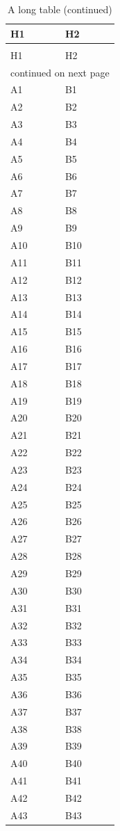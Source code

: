 \documentclass{article}
\begin{document}
\begin{longtable}{ll}
  \caption{A long table}\label{tab:a}\\
  H1 & H2 \\
  \endfirsthead
  \caption[]{A long table (continued)}\\
  H1 & H2 \\
  \endhead
  \multicolumn{2}{r}{continued on next page}\\
  \endfoot
  \endlastfoot
  A1 & B1 \\ A2 & B2 \\ A3 & B3 \\ A4 & B4 \\ A5 & B5 \\ A6 & B6 \\ A7 & B7 \\
  A8 & B8 \\ A9 & B9 \\ A10 & B10 \\ A11 & B11 \\ A12 & B12 \\ A13 & B13 \\
  A14 & B14 \\ A15 & B15 \\ A16 & B16 \\ A17 & B17 \\ A18 & B18 \\ A19 & B19 \\
  A20 & B20 \\ A21 & B21 \\ A22 & B22 \\ A23 & B23 \\ A24 & B24 \\ A25 & B25 \\
  A26 & B26 \\ A27 & B27 \\ A28 & B28 \\ A29 & B29 \\ A30 & B30 \\ A31 & B31 \\
  A32 & B32 \\ A33 & B33 \\ A34 & B34 \\ A35 & B35 \\ A36 & B36 \\ A37 & B37 \\
  A38 & B38 \\ A39 & B39 \\ A40 & B40 \\ A41 & B41 \\ A42 & B42 \\ A43 & B43 \\

\end{longtable}
\end{document}
